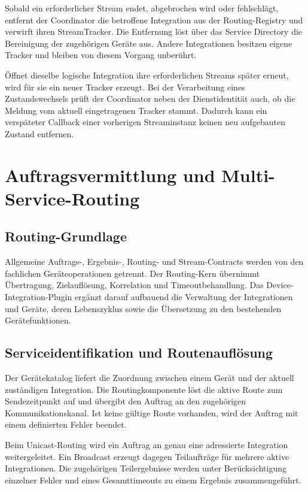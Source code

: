 Sobald ein erforderlicher Stream endet, abgebrochen wird oder fehlschlägt, entfernt der Coordinator die betroffene Integration aus der Routing-Registry und verwirft ihren StreamTracker. Die Entfernung löst über das Service Directory die Bereinigung der zugehörigen Geräte aus. Andere Integrationen besitzen eigene Tracker und bleiben von diesem Vorgang unberührt.

Öffnet dieselbe logische Integration ihre erforderlichen Streams später erneut, wird für sie ein neuer Tracker erzeugt. Bei der Verarbeitung eines Zustandswechsels prüft der Coordinator neben der Dienstidentität auch, ob die Meldung vom aktuell eingetragenen Tracker stammt. Dadurch kann ein verspäteter Callback einer vorherigen Streaminstanz keinen neu aufgebauten Zustand entfernen.

\section{Auftragsvermittlung und Multi-Service-Routing}

\subsection{Routing-Grundlage}

Allgemeine Auftrags-, Ergebnis-, Routing- und Stream-Contracts werden von den fachlichen Geräteoperationen getrennt. Der Routing-Kern übernimmt Übertragung, Zielauflösung, Korrelation und Timeoutbehandlung. Das Device-Integration-Plugin ergänzt darauf aufbauend die Verwaltung der Integrationen und Geräte, deren Lebenszyklus sowie die Übersetzung zu den bestehenden Gerätefunktionen.

\subsection{Serviceidentifikation und Routenauflösung}

Der Gerätekatalog liefert die Zuordnung zwischen einem Gerät und der aktuell zuständigen Integration. Die Routingkomponente löst die aktive Route zum Sendezeitpunkt auf und übergibt den Auftrag an den zugehörigen Kommunikationskanal. Ist keine gültige Route vorhanden, wird der Auftrag mit einem definierten Fehler beendet.

Beim Unicast-Routing wird ein Auftrag an genau eine adressierte Integration weitergeleitet. Ein Broadcast erzeugt dagegen Teilaufträge für mehrere aktive Integrationen. Die zugehörigen Teilergebnisse werden unter Berücksichtigung einzelner Fehler und eines Gesamttimeouts zu einem Ergebnis zusammengeführt.

